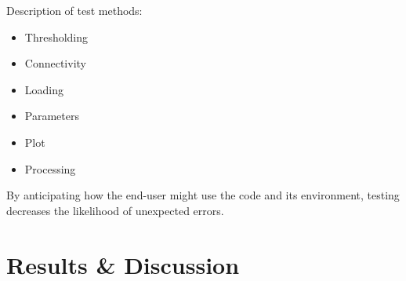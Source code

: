 \begin{enumerate}
Description of test methods:
        \begin{itemize}
            \item Thresholding
            \item Connectivity
            \item Loading
            \item Parameters
            \item Plot
            \item Processing
        \end{itemize}

By anticipating how the end-user might use the code and its environment, testing decreases the likelihood of unexpected errors. 



\end{enumerate}

\section{Results \& Discussion}
